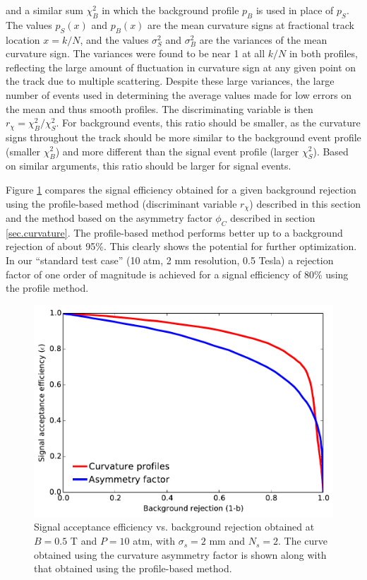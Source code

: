 \documentclass{JINST}
\begin{document}
\noindent and a similar sum $\chi^2_B$ in which the background profile $p_{B}$ is used in place of $p_{S}$.  The values $p_S(x)$ and $p_B(x)$ are the mean curvature signs at fractional track location $x = k/N$, and the values $\sigma^2_S$ and $\sigma^2_B$ are the variances of the mean curvature sign.  The variances were found to be near 1 at all $k/N$ in both profiles, reflecting the large amount of fluctuation in curvature sign at any given point on the track due to multiple scattering.  Despite these large variances, the large number of events used in determining the average values made for low errors on the mean and thus smooth profiles.  The discriminating variable is then $r_{\chi} = \chi^2_B/\chi^2_{S}$.  For background events, this ratio should be smaller, as the curvature signs throughout the track should be more similar to the background event profile (smaller $\chi^2_B$) and more different than the signal event profile (larger $\chi^2_S$).  Based on similar arguments, this ratio should be larger for signal events.

Figure \ref{fig_svsbprof} compares the signal efficiency obtained for a given background rejection using the profile-based method (discriminant variable $r_{\chi}$) described in this section and the method based on the asymmetry factor $\phi_{C}$ described in section \ref{sec.curvature}.  The profile-based method performs better up to a background rejection of about 95\%.  This clearly shows the potential for further optimization. In our ``standard test case'' (10 atm, 2 mm resolution, 0.5 Tesla) a rejection factor of one order of magnitude is achieved for a signal efficiency of 80\% using the profile method. 

\begin{figure}[!htb]
	\centering
	\includegraphics[scale=0.55]{fig/sigvsb_prof_vs_asymm.pdf}
	\caption{\label{fig_svsbprof}Signal acceptance efficiency vs. background rejection obtained at $B = 0.5$ T and $P = 10$ atm, with $\sigma_{s} = 2$ mm and $N_{s} = 2$.  The curve obtained using the curvature asymmetry factor is shown along with that obtained using the profile-based method.}
\end{figure}
\end{document}
